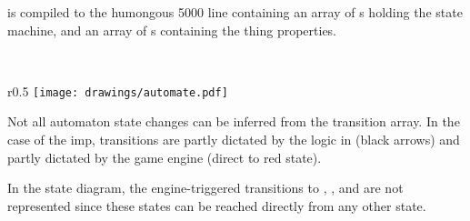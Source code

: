  is compiled to the humongous 5000 line  containing an array of s holding the state machine, and an array of s containing the thing properties.\\
\par
{}\\
\par
\begin{wrapfigure}[9]{r}{0.5\textwidth}
\centering
\texttt{[image: drawings/automate.pdf]}
\end{wrapfigure}
Not all automaton state changes can be inferred from the transition array. In the case of the imp, transitions are partly dictated by the logic in  (black arrows) and partly dictated by the game engine (direct to red state).\\
\par
 In the state diagram, the engine-triggered transitions to , , and  are not represented since these states can be reached directly from any other state.
\par

\pagebreak

